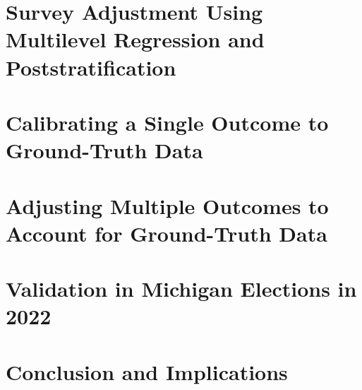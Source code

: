 \documentclass[11pt]{article}
\DeclareMathOperator*{\1}{\mathbbm{1}}
\begin{document}
\begin{bibunit}



\section{Survey Adjustment Using Multilevel Regression and Poststratification}
\label{sec:mrp-overview}



\section{Calibrating a Single Outcome to Ground-Truth Data}
\label{sec:singleadjust}



\section{Adjusting Multiple Outcomes to Account for Ground-Truth Data}
\label{sec:multiadjust}


\section{Validation in Michigan Elections in 2022}
\label{sec:validation}



\section{Conclusion and Implications}
\label{sec:conclusion}



\clearpage
\begin{singlespace}
% 
  \renewcommand{\refname}{References} %
  \putbib  %

\end{singlespace}
\end{bibunit}
\end{document}

